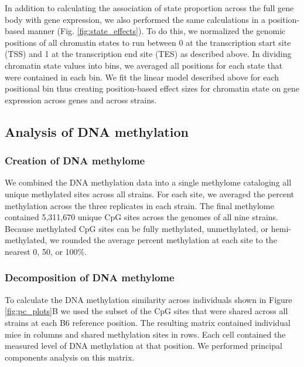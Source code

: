 \documentclass[
  11pt,
]{article}
\begin{document}
In addition to calculating the association of state proportion across
the full gene body with gene expression, we also performed the same
calculations in a position-based manner (Fig. \ref{fig:state_effects}).
To do this, we normalized the genomic positions of all chromatin states
to run between 0 at the transcription start site (TSS) and 1 at the
transcription end site (TES) as described above. In dividing chromatin
state values into bins, we averaged all positions for each state that
were contained in each bin. We fit the linear model described above for
each positional bin thus creating position-based effect sizes for
chromatin state on gene expression across genes and across strains.

\hypertarget{analysis-of-dna-methylation}{%
\subsection{Analysis of DNA
methylation}\label{analysis-of-dna-methylation}}

\hypertarget{creation-of-dna-methylome}{%
\subsubsection{Creation of DNA
methylome}\label{creation-of-dna-methylome}}

We combined the DNA methylation data into a single methylome cataloging
all unique methylated sites across all strains. For each site, we
averaged the percent methylation across the three replicates in each
strain. The final methylome contained 5,311,670 unique CpG sites across
the genomes of all nine strains. Because methylated CpG sites can be
fully methylated, unmethylated, or hemi-methylated, we rounded the
average percent methylation at each site to the nearest 0, 50, or 100\%.

\hypertarget{decomposition-of-dna-methylome}{%
\subsubsection{Decomposition of DNA
methylome}\label{decomposition-of-dna-methylome}}

To calculate the DNA methylation similarity across individuals shown in
Figure \ref{fig:pc_plots}B we used the subset of the CpG sites that were
shared across all strains at each B6 reference position. The resulting
matrix contained individual mice in columns and shared methylation sites
in rows. Each cell contained the measured level of DNA methylation at
that position. We performed principal components analysis on this
matrix.
\end{document}
